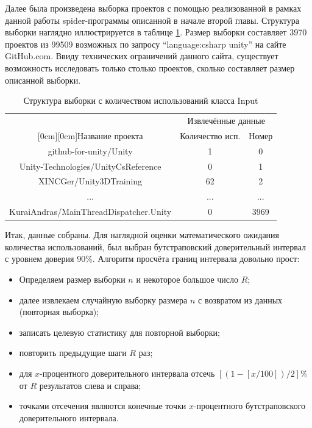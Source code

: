 Далее была произведена выборка проектов с помощью реализованной в рамках данной работы spider-программы описанной в начале второй главы. Структура выборки наглядно иллюстрируется в таблице \ref{tab:sample}. Размер выборки составляет 3970 проектов из 99509 возможных по запросу ``language:csharp unity'' на сайте GitHub.com. Ввиду технических ограничений данного сайта, существует возможность исследовать только столько проектов, сколько составляет размер описанной выборки.

\begin{table}[H]
	\caption{\label{tab:sample}Структура выборки с количеством использований класса Input}
	\begin{center}
		\begin{tabular}{|c|c|c|}
			\hline
			& \multicolumn{2}{c|}{Извлечённые данные} \\
			\cline{2-3}
			\raisebox{1.5ex}[0cm][0cm]{Название проекта}
			& Количество исп. & Номер \\
			\hline
			github-for-unity/Unity & 1 & 0 \\
			\hline
			Unity-Technologies/UnityCsReference & 0 & 1 \\
			\hline
			XINCGer/Unity3DTraining & 62 & 2 \\
			\hline
			... & ... & ... \\
			\hline
			KuraiAndras/MainThreadDispatcher.Unity & 0 & 3969 \\
			\hline
		\end{tabular}
	\end{center}
\end{table}

Итак, данные собраны. Для наглядной оценки математического ожидания количества использований, был выбран бутстраповский доверительный интервал \cite{oreilly} с уровнем доверия 90\%. Алгоритм просчёта границ интервала довольно прост:

\begin{itemize}
	\item Определяем размер выборки $n$ и некоторое большое число $R$;
	\item далее извлекаем случайную выборку размера $n$ с возвратом из данных (повторная выборка);
	\item записать целевую статистику для повторной выборки;
	\item повторить предыдущие шаги $R$ раз;
	\item для $x$-процентного доверительного интервала отсечь $\left[(1-\left[x / 100\right])/2\right]\%$ от $R$ результатов слева и справа;
	\item точками отсечения являются конечные точки $x$-процентного бутстраповского доверительного интервала.
\end{itemize}

